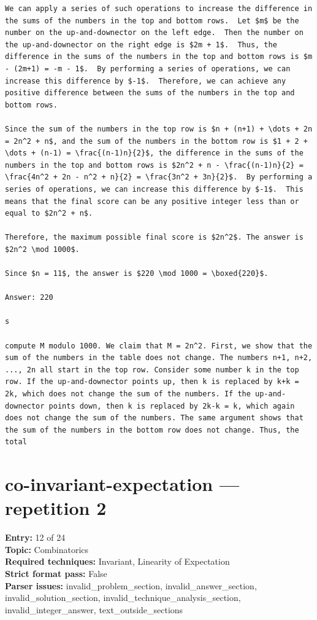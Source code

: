 \documentclass[11pt]{article}
\begin{document}
\begin{Verbatim}[breaklines=true,breakanywhere=true,fontsize=\small]
We can apply a series of such operations to increase the difference in the sums of the numbers in the top and bottom rows.  Let $m$ be the number on the up-and-downector on the left edge.  Then the number on the up-and-downector on the right edge is $2m + 1$.  Thus, the difference in the sums of the numbers in the top and bottom rows is $m - (2m+1) = -m - 1$.  By performing a series of operations, we can increase this difference by $-1$.  Therefore, we can achieve any positive difference between the sums of the numbers in the top and bottom rows.

Since the sum of the numbers in the top row is $n + (n+1) + \dots + 2n = 2n^2 + n$, and the sum of the numbers in the bottom row is $1 + 2 + \dots + (n-1) = \frac{(n-1)n}{2}$, the difference in the sums of the numbers in the top and bottom rows is $2n^2 + n - \frac{(n-1)n}{2} = \frac{4n^2 + 2n - n^2 + n}{2} = \frac{3n^2 + 3n}{2}$.  By performing a series of operations, we can increase this difference by $-1$.  This means that the final score can be any positive integer less than or equal to $2n^2 + n$.

Therefore, the maximum possible final score is $2n^2$. The answer is $2n^2 \mod 1000$.

Since $n = 11$, the answer is $220 \mod 1000 = \boxed{220}$.

Answer: 220

s

compute M modulo 1000. We claim that M = 2n^2. First, we show that the sum of the numbers in the table does not change. The numbers n+1, n+2, ..., 2n all start in the top row. Consider some number k in the top row. If the up-and-downector points up, then k is replaced by k+k = 2k, which does not change the sum of the numbers. If the up-and-downector points down, then k is replaced by 2k-k = k, which again does not change the sum of the numbers. The same argument shows that the sum of the numbers in the bottom row does not change. Thus, the total
\end{Verbatim}
\clearpage
\section{co-invariant-expectation --- repetition 2}
{\color{metadata}
\textbf{Entry:} 12 of 24\\
\textbf{Topic:} Combinatorics\\
\textbf{Required techniques:} Invariant, Linearity of Expectation\\
\textbf{Strict format pass:} False\\
\textbf{Parser issues:} invalid\_problem\_section, invalid\_answer\_section, invalid\_solution\_section, invalid\_technique\_analysis\_section, invalid\_integer\_answer, text\_outside\_sections
}
\end{document}
